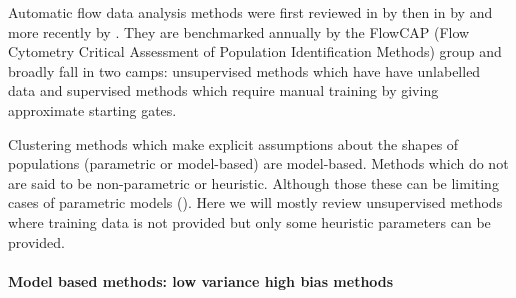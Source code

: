 Automatic flow data analysis methods were first reviewed in \citeyear{Bashashati:2009em} by \citeauthor{Bashashati:2009em} then in \citeyear{Lugli:2010ki} by \citeauthor{Lugli:2010ki}
and more recently by \citet{Aghaeepour:2013dg}.
They are benchmarked annually by the FlowCAP (Flow Cytometry Critical Assessment of Population Identification Methods)
group and broadly fall in two camps:
unsupervised methods which have have unlabelled data
and
supervised methods which require manual training by giving approximate starting gates.

Clustering methods which make explicit assumptions about the shapes of populations (parametric or model-based)
are model-based.
Methods which do not are said to be non-parametric or heuristic.
Although those these can be limiting cases of parametric models ().
Here we will mostly review unsupervised methods where training data is not provided but only some heuristic parameters can be provided.

\paragraph{Model based methods: low variance high bias methods}

